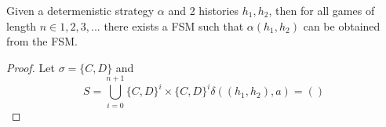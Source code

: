 \begin{theorem}\label{thm:fsm}
Given a determenistic strategy $\alpha$ and 2 histories $h_1, h_2$, then for all games of length $n \in 1,2,3,...$ there exists a FSM such that $\alpha(h_1, h_2)$ can be obtained from the FSM.
\end{theorem}

\begin{proof}\label{prf:fsm}
Let $\sigma = \{C, D\}$ and
\[
S = \bigcup_{i=0}^{n+1} \{C, D\}^i \times \{C, D\}^i
\delta((h_1, h_2), a) =()
\]

\end{proof}



\lipsum
